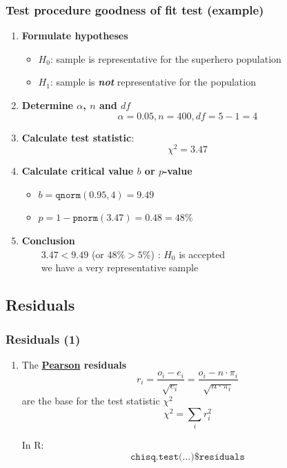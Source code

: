 \documentclass{beamer}
\begin{document}
\begin{frame}
\frametitle{Test procedure goodness of fit test (example)}
\begin{enumerate}
    \item \textbf{Formulate hypotheses}
      \begin{itemize}
        \item $H_{0}$: sample is representative for the superhero population
        \item $H_{1}$: sample is \textbf{\emph{not}} representative for the population
      \end{itemize}
    \item \textbf{Determine $\alpha$, $n$ and $df$}
        \[ \alpha = 0.05 , n = 400, df = 5-1 = 4 \]
    \item \textbf{Calculate test statistic}:
        \[ \chi^{2} = 3.47 \]
    \item \textbf{Calculate critical value $b$ or $p$-value}
      \begin{itemize}
        \item $b = \texttt{qnorm}(0.95,4) = 9.49$
        \item $p = 1-\texttt{pnorm}(3.47) = 0.48 = 48\%$
      \end{itemize}
    \item \textbf{Conclusion}\\
    ~~~~$3.47 < 9.49$ (or $48\% > 5\%$) : $H_0$ is accepted\\
    ~~~~we have a very representative sample
\end{enumerate}
\end{frame}

\subsection{Residuals}

\begin{frame}
\frametitle{Residuals (1)}


\begin{enumerate}
    \item The \textbf{\underline{Pearson} residuals}
    \[ r_i = \frac{o_i-e_i}{\sqrt{e_i}} = \frac{o_i - n \cdot \pi_i}{\sqrt{n \cdot \pi_i}} \]
    are the base for the test statistic $\chi^2$
    \[ \chi^2 = \sum_{i}{r_i^2} \]

In R:
\[ \texttt{chisq.test(...)\$residuals} \]
\end{enumerate}

\end{frame}
\end{document}
